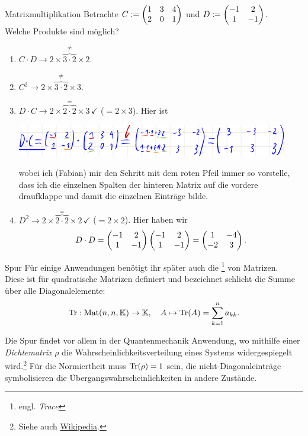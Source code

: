 \begin{Beispiel}{Matrixmultiplikation}
Betrachte $C:=\begin{pmatrix}1&3&4\\2&0&1\end{pmatrix}$ und $D:=\begin{pmatrix}-1&2\\1&-1\end{pmatrix}.$\\
Welche Produkte sind möglich?
\begin{enumerate}
    \item $C\cdot D\rightarrow 2\times \overbrace{3\cdot 2}^{\neq} \times 2$. \Lightning
    \item $C^2\rightarrow 2\times \overbrace{3\cdot 2}^{\neq} \times 3$. \Lightning
    \item $D\cdot C\rightarrow 2\times \overbrace{2\cdot 2}^= \times 3\,\checkmark$ ($=2\times 3$). Hier ist
\begin{center}
    \includegraphics[width=.5\textwidth]{Dateien/00/12DMalC.PNG}
\end{center}
wobei ich (Fabian) mir den Schritt mit dem roten Pfeil immer so vorstelle, dass ich die einzelnen Spalten der hinteren Matrix auf die vordere draufklappe und damit die einzelnen Einträge bilde.
    \item $D^2\rightarrow 2\times \overbrace{2\cdot 2}^= \times 2\,\checkmark $ ($=2\times 2$). Hier haben wir
    \begin{equation*}
        D\cdot D=\begin{pmatrix}-1&2\\1&-1\end{pmatrix}\begin{pmatrix}-1&2\\1&-1\end{pmatrix}=\begin{pmatrix}1&-4\\-2&3\end{pmatrix}.
    \end{equation*}
\end{enumerate}
\end{Beispiel}
\begin{Def}
{Spur}
Für einige Anwendungen benötigt ihr später auch die \footnote{engl. \textit{Trace}} von Matrizen.\\
Diese ist für quadratische Matrizen definiert und bezeichnet schlicht die Summe über alle Diagonalelemente:
\begin{equation*}
    \text{Tr}:\text{Mat}(n,n,\mathbb{K})\to \mathbb{K},\quad A\mapsto \text{Tr}(A)=\sum_{k=1}^na_{kk}.
\end{equation*}
\end{Def}
Die Spur findet vor allem in der Quantenmechanik Anwendung, wo mithilfe einer \textit{Dichtematrix} $\rho$ die Wahrscheinlichkeitsverteilung eines Systems widergespiegelt wird.\footnote{Siehe auch \href{https://de.wikipedia.org/wiki/Dichteoperator}{Wikipedia}.} Für die Normiertheit muss $\text{Tr}(\rho)=1$ sein, die nicht-Diagonaleinträge symbolisieren die Übergangswahrscheinlichkeiten in andere Zustände.\\
